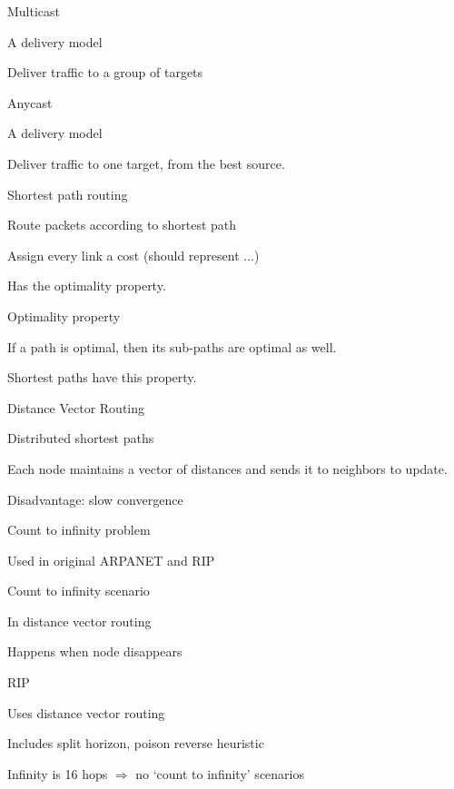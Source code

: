 \documentclass[main.tex]{subfiles}
\begin{document}
\begin{card}{Multicast}
\item A delivery model
\item Deliver traffic to a group of targets
\end{card}

\begin{card}{Anycast}
\item A delivery model
\item Deliver traffic to one target, from the best source.
\end{card}

\begin{card}{Shortest path routing}
\item Route packets according to shortest path
\item Assign every link a cost (should represent ...)
\item Has the optimality property.
\end{card}

\begin{card}{Optimality property}
\item If a path is optimal, then its sub-paths are optimal as well.
\item Shortest paths have this property.
\end{card}

\begin{card}{Distance Vector Routing}
\item Distributed shortest paths
\item Each node maintains a vector of distances and sends it to neighbors to update.
\item Disadvantage: slow convergence
\item Count to infinity problem
\item Used in original ARPANET and RIP
\end{card}

\begin{card}{Count to infinity scenario}
\item In distance vector routing
\item Happens when node disappears
\end{card}

\begin{card}{RIP}
\item Uses distance vector routing
\item Includes split horizon, poison reverse heuristic
\item Infinity is 16 hops $\Rightarrow$ no `count to infinity' scenarios
\end{card}
\end{document}
